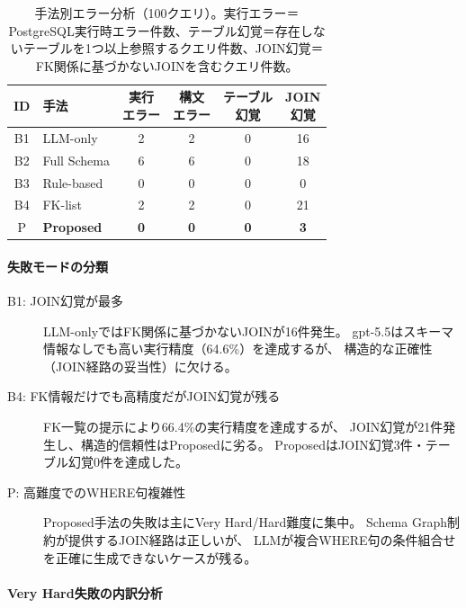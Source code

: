 \documentclass[5p,twocolumn]{elsarticle}
\begin{document}
\begin{table}[htbp]
  \centering
  \caption{手法別エラー分析（100クエリ）。実行エラー＝PostgreSQL実行時エラー件数、テーブル幻覚＝存在しないテーブルを1つ以上参照するクエリ件数、JOIN幻覚＝FK関係に基づかないJOINを含むクエリ件数。}
  \label{tab:error_analysis}
  \small
  \begin{tabular}{clcccc}
    \toprule
    ID & 手法 & \shortstack{実行\\エラー} & \shortstack{構文\\エラー} & \shortstack{テーブル\\幻覚} & \shortstack{JOIN\\幻覚} \\
    \midrule
    B1 & LLM-only & 2 & 2 & 0 & 16 \\
    B2 & Full Schema & 6 & 6 & 0 & 18 \\
    B3 & Rule-based & 0 & 0 & 0 & 0 \\
    B4 & FK-list & 2 & 2 & 0 & 21 \\
    P & \textbf{Proposed} & \textbf{0} & \textbf{0} & \textbf{0} & \textbf{3} \\
    \bottomrule
  \end{tabular}
\end{table}

\paragraph{失敗モードの分類}

\begin{description}
  \item[B1: JOIN幻覚が最多]
    LLM-onlyではFK関係に基づかないJOINが16件発生。
    gpt-5.5はスキーマ情報なしでも高い実行精度（64.6\%）を達成するが、
    構造的な正確性（JOIN経路の妥当性）に欠ける。
  \item[B4: FK情報だけでも高精度だがJOIN幻覚が残る]
    FK一覧の提示により66.4\%の実行精度を達成するが、
    JOIN幻覚が21件発生し、構造的信頼性はProposedに劣る。
    ProposedはJOIN幻覚3件・テーブル幻覚0件を達成した。
  \item[P: 高難度でのWHERE句複雑性]
    Proposed手法の失敗は主にVery Hard/Hard難度に集中。
    Schema Graph制約が提供するJOIN経路は正しいが、
    LLMが複合WHERE句の条件組合せを正確に生成できないケースが残る。
\end{description}

\paragraph{Very Hard失敗の内訳分析}
\end{document}
